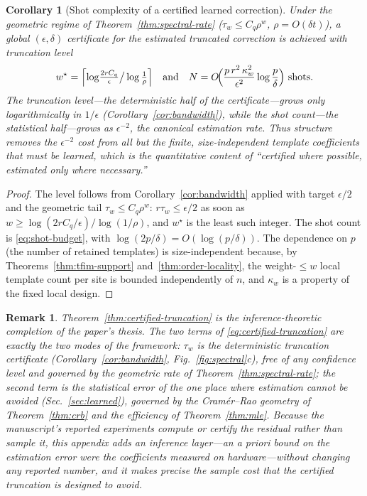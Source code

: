 \documentclass[aps,prxquantum,reprint,superscriptaddress,nofootinbib,amsmath,amssymb]{revtex4-2}
\newcommand{\dt}{\delta t}
\newtheorem{corollary}{Corollary}
\newtheorem{remark}{Remark}
\begin{document}
\begin{corollary}[Shot complexity of a certified learned correction]
\label{cor:shot-complexity}
Under the geometric regime of Theorem~\ref{thm:spectral-rate} ($\tau_w\leq C_q\rho^w$, $\rho=O(\dt)$), a global $(\epsilon,\delta)$ certificate for the estimated truncated correction is achieved with truncation level
\begin{equation*}
    w^\star=\Bigl\lceil\log\!\tfrac{2rC_q}{\epsilon}\big/\log\tfrac1\rho\Bigr\rceil
    \quad\text{and}\quad
    N=O\!\Bigl(\frac{p\,r^2\,\kappa_w^2}{\epsilon^2}\log\frac p\delta\Bigr)\ \text{shots.}
\end{equation*}
The truncation level---the deterministic half of the certificate---grows only logarithmically in $1/\epsilon$ (Corollary~\ref{cor:bandwidth}), while the shot count---the statistical half---grows as $\epsilon^{-2}$, the canonical estimation rate. Thus structure removes the $\epsilon^{-2}$ cost from all but the finite, size-independent template coefficients that must be learned, which is the quantitative content of ``certified where possible, estimated only where necessary.''
\end{corollary}

\begin{proof}
The level follows from Corollary~\ref{cor:bandwidth} applied with target $\epsilon/2$ and the geometric tail $\tau_w\leq C_q\rho^w$: $r\tau_{w}\leq\epsilon/2$ as soon as $w\geq\log(2rC_q/\epsilon)/\log(1/\rho)$, and $w^\star$ is the least such integer. The shot count is \eqref{eq:shot-budget}, with $\log(2p/\delta)=O(\log(p/\delta))$. The dependence on $p$ (the number of retained templates) is size-independent because, by Theorems~\ref{thm:tfim-support} and~\ref{thm:order-locality}, the weight-$\leq w$ local template count per site is bounded independently of $n$, and $\kappa_w$ is a property of the fixed local design.
\end{proof}

\begin{remark}
Theorem~\ref{thm:certified-truncation} is the inference-theoretic completion of the paper's thesis. The two terms of \eqref{eq:certified-truncation} are exactly the two modes of the framework: $\tau_w$ is the \emph{deterministic} truncation certificate (Corollary~\ref{cor:bandwidth}, Fig.~\ref{fig:spectral}c), free of any confidence level and governed by the geometric rate of Theorem~\ref{thm:spectral-rate}; the second term is the \emph{statistical} error of the one place where estimation cannot be avoided (Sec.~\ref{sec:learned}), governed by the Cram\'er--Rao geometry of Theorem~\ref{thm:crb} and the efficiency of Theorem~\ref{thm:mle}. Because the manuscript's reported experiments compute or certify the residual rather than sample it, this appendix adds an inference layer---an a priori bound on the estimation error \emph{were} the coefficients measured on hardware---without changing any reported number, and it makes precise the sample cost that the certified truncation is designed to avoid.
\end{remark}
\end{document}

